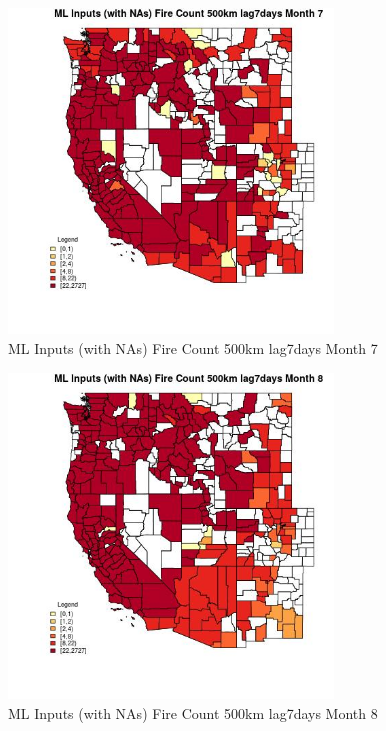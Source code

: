\begin{figure} 
\centering  
\includegraphics[width=0.77\textwidth]{Code_Outputs/Report_ML_input_PM25_Step4_part_f_de_duplicated_aveswNAs_CountyFire_Count_500km_lag7daysmedianMonth7.jpg} 
\caption{\label{fig:Report_ML_input_PM25_Step4_part_f_de_duplicated_aveswNAsCountyFire_Count_500km_lag7daysmedianMonth7}ML Inputs (with NAs) Fire Count 500km lag7days Month 7} 
\end{figure} 
 

\begin{figure} 
\centering  
\includegraphics[width=0.77\textwidth]{Code_Outputs/Report_ML_input_PM25_Step4_part_f_de_duplicated_aveswNAs_CountyFire_Count_500km_lag7daysmedianMonth8.jpg} 
\caption{\label{fig:Report_ML_input_PM25_Step4_part_f_de_duplicated_aveswNAsCountyFire_Count_500km_lag7daysmedianMonth8}ML Inputs (with NAs) Fire Count 500km lag7days Month 8} 
\end{figure} 
 

